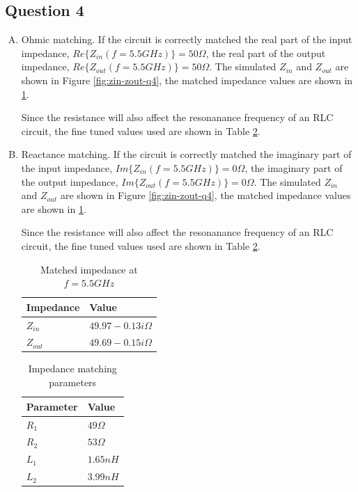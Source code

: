 \documentclass{article}
\begin{document}
\subsection{Question 4}
\label{sec:orge3a9c9b}
\begin{enumerate}[A.]
\item Ohmic matching. If the circuit is correctly matched the real part of the input impedance,
\(Re\{Z_{in}(f = 5.5GHz)\} = 50 \Omega\),
the real part of the output impedance, \(Re\{Z_{out}(f = 5.5GHz)\} = 50 \Omega\).
The simulated \(Z_{in}\) and \(Z_{out}\) are shown in Figure \ref{fig:zin-zout-q4},
the matched impedance values are shown in \ref{tab:zin-zout-q4}.

Since the resistance will also affect the resonanance frequency of an RLC circuit,
the fine tuned values used are shown in Table \ref{tab:param-q4}.

\item Reactance matching. If the circuit is correctly matched the imaginary part of the input impedance,
\(Im\{Z_{in}(f = 5.5GHz)\} = 0 \Omega\),
the imaginary part of the output impedance, \(Im\{Z_{out}(f = 5.5GHz)\} = 0 \Omega\).
The simulated \(Z_{in}\) and \(Z_{out}\) are shown in Figure \ref{fig:zin-zout-q4},
the matched impedance values are shown in \ref{tab:zin-zout-q4}.

Since the resistance will also affect the resonanance frequency of an RLC circuit,
the fine tuned values used are shown in Table \ref{tab:param-q4}.

\begin{table}[htbp]
\caption{\label{tab:zin-zout-q4}Matched impedance at \(f = 5.5GHz\)}
\centering
\begin{tabular}{ll}
\hline
Impedance & Value\\
\hline
\(Z_{in}\) & \(49.97 - 0.13i \Omega\)\\
\(Z_{out}\) & \(49.69 - 0.15i \Omega\)\\
\hline
\end{tabular}
\end{table}

\begin{table}[htbp]
\caption{\label{tab:param-q4}Impedance matching parameters}
\centering
\begin{tabular}{ll}
\hline
Parameter & Value\\
\hline
\(R_{1}\) & \(49 \Omega\)\\
\(R_{2}\) & \(53 \Omega\)\\
\(L_{1}\) & \(1.65 nH\)\\
\(L_{2}\) & \(3.99 nH\)\\
\hline
\end{tabular}
\end{table}


\end{enumerate}
\end{document}
